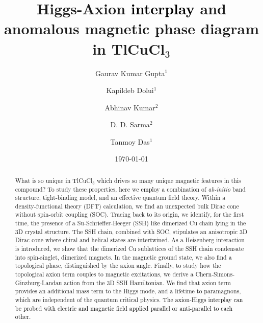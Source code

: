 \documentclass[aps,prl,showpacs,twocolumn,groupedaddress]{revtex4-1}
\newcommand{\blue}{\textcolor{black}}
\begin{document}
\title{Higgs-Axion \blue{interplay} and anomalous magnetic phase diagram in TlCuCl$_3$}


\author{Gaurav Kumar Gupta$^1$}
\author{Kapildeb Dolui$^1$}
\author{Abhinav Kumar$^2$}
\author{D. D. Sarma$^2$}
\author{Tanmoy Das$^1$}


\date{\today}

\begin{abstract}
What is so unique in TlCuCl$_3$ which drives so many unique magnetic features in this compound? To study these properties, here we \blue{employ} a combination of {\it ab-initio} band structure, tight-binding model, and an effective quantum field theory. Within a density-functional theory (DFT) calculation, we find an unexpected bulk Dirac cone without spin-orbit coupling (SOC). Tracing back to its origin, we identify, for the first time, the presence of a Su-Schrieffer-Heeger (SSH) like dimerized Cu chain lying in the \blue{3D} crystal structure. The SSH chain, combined with SOC, stipulates an anisotropic 3D Dirac cone where chiral and helical states are intertwined. As a Heisenberg interaction is introduced, we show that the dimerized Cu sublattices of the SSH chain condensate into spin-singlet, dimerized magnets. In the magnetic ground state, we also find a topological phase, distinguished by the axion \blue{angle}. Finally, to study how the topological axion term couples to magnetic excitations, we derive a Chern-Simons-Ginzburg-Landau action from the 3D SSH Hamiltonian. We find that axion term provides an additional mass term to the Higgs mode, and a lifetime to paramagnons, which are independent of the quantum critical physics. \blue{The axion-Higgs interplay can be probed with electric and magnetic field applied parallel or anti-parallel to each other.}
\end{abstract}
\end{document}
